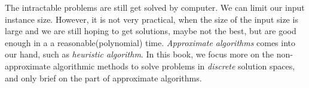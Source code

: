 \documentclass[../main.tex]{subfiles}
\begin{document}
    
    



The intractable problems are still get solved by computer. We can limit our input instance size. However, it is not very practical, when the size of the input size is large and we are still hoping to get solutions, maybe not the best, but are good enough in a a reasonable(polynomial) time.   \textit{Approximate algorithms} comes into our hand,  such as \textit{heuristic algorithm}. In this book, we focus more on the non-approximate algorithmic methods to solve problems in \textit{discrete} solution spaces, and only brief on the part of approximate algorithms. 
\end{document}
